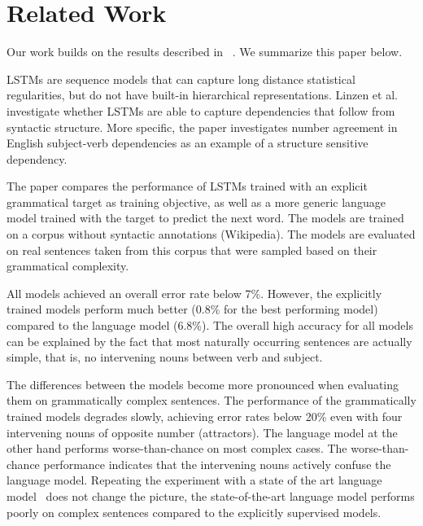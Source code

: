 \section{Related Work}
\label{related work}

Our work builds on the results described in ~\citep{Linzen2016}.  
We summarize this paper below.

LSTMs are sequence models that can capture long distance statistical regularities,
but do not have built-in hierarchical representations.
Linzen et al. investigate whether LSTMs are able to capture
dependencies that follow from syntactic structure. More specific,
the paper investigates number agreement in English subject-verb dependencies
as an example of a structure sensitive dependency.

The paper compares the performance of LSTMs
trained with an explicit grammatical target as training objective,
as well as a more generic language model trained with the target to
predict the next word. 
The models are trained on a corpus without syntactic annotations (Wikipedia).
The models are evaluated on real sentences taken from this corpus
that were sampled based on their grammatical complexity. 
  
All models achieved an overall error rate below 7\%. However,
the explicitly trained models perform much better 
(0.8\% for the best performing model)
compared to the language model (6.8\%). 
The overall high accuracy for all models can be explained by
the fact that most naturally occurring sentences are actually
simple, that is, no intervening nouns between verb and subject.

The differences between the models become more pronounced
when evaluating them on grammatically complex sentences.
The performance of the grammatically trained models
degrades slowly, achieving error rates below 20\% even with
four intervening nouns of opposite number (attractors).
The language model at the other hand performs worse-than-chance
on most complex cases. The worse-than-chance performance
indicates that the intervening nouns actively confuse
the language model. Repeating the experiment with a
state of the art language model~\citep{Jozefowicz2016} does not
change the picture, the state-of-the-art language model 
performs poorly on complex sentences 
compared to the explicitly supervised models.


